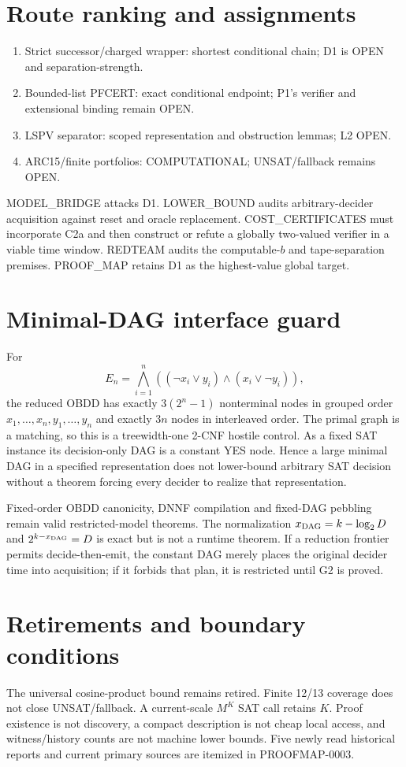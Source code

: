 \documentclass[11pt]{article}
\begin{document}
\section*{Route ranking and assignments}
\begin{enumerate}
\item Strict successor/charged wrapper: shortest conditional chain; D1 is
OPEN and separation-strength.
\item Bounded-list PFCERT: exact conditional endpoint; P1's verifier and
extensional binding remain OPEN.
\item LSPV separator: scoped representation and obstruction lemmas; L2 OPEN.
\item ARC15/finite portfolios: COMPUTATIONAL; UNSAT/fallback remains OPEN.
\end{enumerate}
MODEL\_BRIDGE attacks D1.  LOWER\_BOUND audits arbitrary-decider acquisition
against reset and oracle replacement.  COST\_CERTIFICATES must incorporate
C2a and then construct or refute a globally two-valued verifier in a viable
time window.  REDTEAM audits the computable-$b$ and tape-separation premises.
PROOF\_MAP retains D1 as the highest-value global target.

\section*{Minimal-DAG interface guard}
For
\[
E_n=\bigwedge_{i=1}^{n}
((\neg x_i\vee y_i)\wedge(x_i\vee\neg y_i)),
\]
the reduced OBDD has exactly $3(2^n-1)$ nonterminal nodes in grouped order
$x_1,\ldots,x_n,y_1,\ldots,y_n$ and exactly $3n$ nodes in interleaved order.
The primal graph is a matching, so this is a treewidth-one 2-CNF hostile
control.  As a fixed SAT instance its decision-only DAG is a constant YES
node.  Hence a large minimal DAG in a specified representation does not
lower-bound arbitrary SAT decision without a theorem forcing every decider
to realize that representation.

Fixed-order OBDD canonicity, DNNF compilation and fixed-DAG pebbling remain
valid restricted-model theorems.  The normalization
$x_{\rm DAG}=k-\log_2D$ and $2^{k-x_{\rm DAG}}=D$ is exact but is not a
runtime theorem.  If a reduction frontier permits decide-then-emit, the
constant DAG merely places the original decider time into acquisition; if it
forbids that plan, it is restricted until G2 is proved.

\section*{Retirements and boundary conditions}
The universal cosine-product bound remains retired.  Finite 12/13 coverage
does not close UNSAT/fallback.  A current-scale $M^K$ SAT call retains $K$.
Proof existence is not discovery, a compact description is not cheap local
access, and witness/history counts are not machine lower bounds.  Five newly
read historical reports and current primary sources are itemized in
PROOFMAP-0003.
\end{document}
